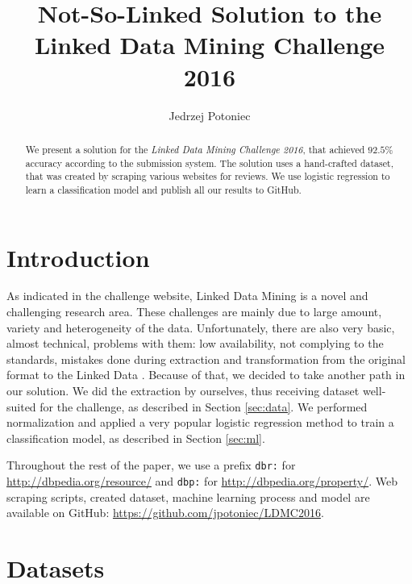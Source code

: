 \documentclass{llncs}
\begin{document}
\title{Not-So-Linked Solution to the Linked Data Mining Challenge 2016}
\author{Jedrzej Potoniec}

\maketitle

\begin{abstract}
We present a solution for the \emph{Linked Data Mining Challenge 2016}, that achieved $92.5\%$ accuracy according to the submission system.
The solution uses a hand-crafted dataset, that was created by scraping various websites for reviews.
We use logistic regression to learn a classification model and publish all our results to GitHub.
\end{abstract}


\section{Introduction}

As indicated in the challenge website, Linked Data Mining is a novel and challenging research area.
These challenges are mainly due to large amount, variety and heterogeneity of the data.
Unfortunately, there are also very basic, almost technical, problems with them: low availability, not complying to the standards, mistakes done during extraction and transformation from the original format to the Linked Data \cite{lodlaudromat}.
Because of that, we decided to take another path in our solution.
We did the extraction by ourselves, thus receiving dataset well-suited for the challenge, as described in Section \ref{sec:data}.
We performed normalization and applied a very popular logistic regression method to train a classification model, as described in Section \ref{sec:ml}.

Throughout the rest of the paper, we use a prefix \texttt{dbr:} for \url{http://dbpedia.org/resource/} and \texttt{dbp:} for \url{http://dbpedia.org/property/}.
Web scraping scripts, created dataset, machine learning process and model are available on GitHub: \url{https://github.com/jpotoniec/LDMC2016}.

\section{Datasets\label{sec:data}}
\end{document}
